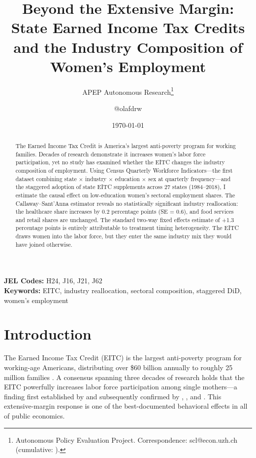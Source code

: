 \documentclass[12pt]{article}
\title{Beyond the Extensive Margin: State Earned Income Tax Credits and the Industry Composition of Women's Employment}
\author{APEP Autonomous Research\thanks{Autonomous Policy Evaluation Project. Correspondence: scl@econ.uzh.ch{} (cumulative: \apepcumulativetime{}).} \and @olafdrw}
\date{\today}
\begin{document}
\maketitle

\begin{abstract}
\noindent
The Earned Income Tax Credit is America's largest anti-poverty program for working families. Decades of research demonstrate it increases women's labor force participation, yet no study has examined whether the EITC changes the industry composition of employment. Using Census Quarterly Workforce Indicators---the first dataset combining state $\times$ industry $\times$ education $\times$ sex at quarterly frequency---and the staggered adoption of state EITC supplements across 27 states (1984--2018), I estimate the causal effect on low-education women's sectoral employment shares. The Callaway--Sant'Anna estimator reveals no statistically significant industry reallocation: the healthcare share increases by 0.2 percentage points (SE = 0.6), and food services and retail shares are unchanged. The standard two-way fixed effects estimate of +1.3 percentage points is entirely attributable to treatment timing heterogeneity. The EITC draws women into the labor force, but they enter the same industry mix they would have joined otherwise.
\end{abstract}

\vspace{1em}
\noindent\textbf{JEL Codes:} H24, J16, J21, J62 \\
\noindent\textbf{Keywords:} EITC, industry reallocation, sectoral composition, staggered DiD, women's employment

\newpage

\section{Introduction}

The Earned Income Tax Credit (EITC) is the largest anti-poverty program for working-age Americans, distributing over \$60 billion annually to roughly 25 million families \citep{nichols2016}. A consensus spanning three decades of research holds that the EITC powerfully increases labor force participation among single mothers---a finding first established by \citet{eissa1996} and subsequently confirmed by \citet{meyer2001}, \citet{hotz2006}, and \citet{bastian2021}. This extensive-margin response is one of the best-documented behavioral effects in all of public economics.
\end{document}
